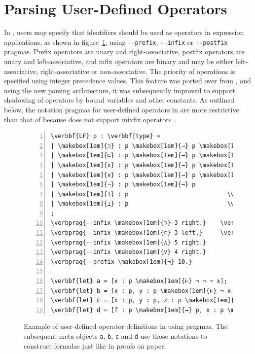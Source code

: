 \section{Parsing User-Defined Operators}\label{section:parsing-user-defined-operators}

In \Beluga, users may specify that identifiers should be used as operators in expression applications, as shown in figure~\ref{figure:operator-pragmas}, using \verb|--prefix|, \verb|--infix| or \verb|--postfix| pragmas.
Prefix operators are unary and right-associative, postfix operators are unary and left-associative, and infix operators are binary and may be either left-associative, right-associative or non-associative.
The priority of operations is specified using integer precedence values.
This feature was ported over from \Twelf, and using the new parsing architecture, it was subsequently improved to support shadowing of operators by bound variables and other constants.
As outlined below, the notation pragmas for user-defined operators in \Beluga are more restrictive than that of \Agda because \Beluga does not support mixfix operators~\cite{danielsson2008parsing}.

\begin{figure}[htb]
\begin{Verbatim}[commandchars=\\\{\}, baselinestretch=1, numbers=left]
\verbbf{LF} p : \verbbf{type} =
| \makebox[1em]{⊃} : p \makebox[1em]{→} p \makebox[1em]{→} p                  \verbcomment{% Logical implication}
| \makebox[1em]{⊂} : p \makebox[1em]{→} p \makebox[1em]{→} p                  \verbcomment{% Converse implication}
| \makebox[1em]{∧} : p \makebox[1em]{→} p \makebox[1em]{→} p                  \verbcomment{% Logical conjunction}
| \makebox[1em]{∨} : p \makebox[1em]{→} p \makebox[1em]{→} p                  \verbcomment{% Logical disjunction}
| \makebox[1em]{¬} : p \makebox[1em]{→} p                       \verbcomment{% Logical negation}
| \makebox[1em]{⊤} : p                            \verbcomment{% Tautology}
| \makebox[1em]{⊥} : p                            \verbcomment{% Contradiction}
;
\verbprag{--infix \makebox[1em]{⊃} 3 right.}    \verbcomment{% Subsequently treat ⊃ as a right-associative}
\verbprag{--infix \makebox[1em]{⊂} 3 left.}     \verbcomment{% infix operator with precedence value 3}
\verbprag{--infix \makebox[1em]{∧} 5 right.}
\verbprag{--infix \makebox[1em]{∨} 4 right.}
\verbprag{--prefix \makebox[1em]{¬} 10.}

\verbbf{let} a = [x : p \makebox[1em]{⊢} ¬ ¬ ¬ x];
\verbbf{let} b = [x : p, y : p \makebox[1em]{⊢} ¬ x ⊂ y ⊂ ⊥];
\verbbf{let} c = [x : p, y : p, z : p \makebox[1em]{⊢} ⊤ ∨ x ∧ ¬ y ⊃ ¬ z];
\verbbf{let} d = [f : p \makebox[1em]{→} p, x : p \makebox[1em]{⊢} ¬ f x ∨ f ⊥];
\end{Verbatim}
\caption[Example of user-defined operator definitions in \Beluga using pragmas]{%
Example of user-defined operator definitions in \Beluga using pragmas.
The subsequent meta-objects \texttt{a}, \texttt{b}, \texttt{c} and \texttt{d} use those notations to construct formulas just like in proofs on paper.
}
\label{figure:operator-pragmas}
\end{figure}

